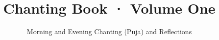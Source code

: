\documentclass[
  babelLanguage=portuguese,
  final,
]{chantingbook}
\title{Chanting Book · Volume One}
\subtitle{Morning and Evening Chanting (Pūjā) and Reflections}
\begin{document}
\mainmatter

\usePsMarksPartOnly

\artopttrue



\artoptfalse






\end{document}

